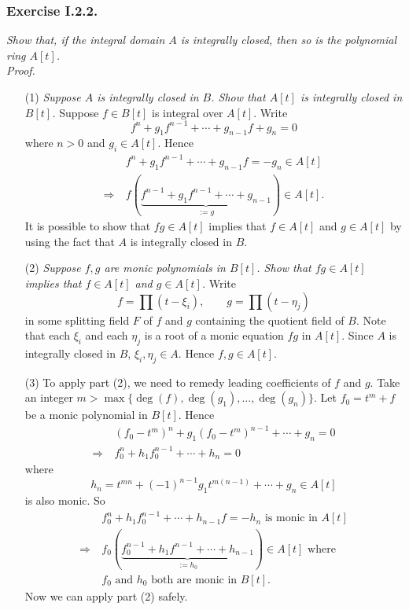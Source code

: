 \documentclass{article}
\begin{document}



\subsubsection*{Exercise I.2.2.}
\emph{Show that, if the integral domain $A$ is integrally closed,
then so is the polynomial ring $A[t]$.} \\



\emph{Proof.}
\begin{enumerate}
\item[(1)]
  \emph{Suppose $A$ is integrally closed in $B$.
  Show that $A[t]$ is integrally closed in $B[t]$.}
  Suppose $f \in B[t]$ is integral over $A[t]$.
  Write
  \[
    f^n + g_1 f^{n-1} + \cdots + g_{n-1} f + g_n = 0 
  \]
  where $n > 0$ and $g_i \in A[t]$.
  Hence
  \begin{align*}
    &\:
    f^n + g_1 f^{n-1} + \cdots + g_{n-1} f = -g_n \in A[t] \\
    \Longrightarrow &\:
    f(\underbrace{f^{n-1} + g_1 f^{n-1} + \cdots + g_{n-1}}_{:= g}) \in A[t].
  \end{align*}
  It is possible to show that $fg \in A[t]$ implies that $f \in A[t]$ and $g \in A[t]$
  by using the fact that $A$ is integrally closed in $B$.

\item[(2)]
  \emph{Suppose $f, g$ are monic polynomials in $B[t]$.
  Show that $fg \in A[t]$ implies that $f \in A[t]$ and $g \in A[t]$.}
  Write
  \[
    f = \prod (t - \xi_i),
    \qquad
    g = \prod (t - \eta_j)
  \]
  in some splitting field $F$ of $f$ and $g$ containing the quotient field of $B$.
  Note that each $\xi_i$ and each $\eta_j$ is a root of a monic equation $fg$ in $A[t]$.
  Since $A$ is integrally closed in $B$, $\xi_i, \eta_j \in A$.
  Hence $f, g \in A[t]$.

\item[(3)]
  To apply part (2), we need to remedy leading coefficients of $f$ and $g$.
  Take an integer $m > \max\{\deg(f), \deg(g_1), \ldots, \deg(g_n) \}$.
  Let $f_0 = t^m + f$ be a monic polynomial in $B[t]$.
  Hence
  \begin{align*}
    &\:
    (f_0 - t^m)^n + g_1 (f_0 - t^m)^{n-1} + \cdots + g_n = 0 \\
    \Longrightarrow &\:
    f_0^n + h_1 f_0^{n-1} + \cdots + h_n = 0
  \end{align*}
  where
  \[
    h_n = t^{mn} + (-1)^{n-1} g_1 t^{m(n-1)} + \cdots + g_n \in A[t]
  \]
  is also monic.
  So
  \begin{align*}
    &\:
    f_0^n + h_1 f_0^{n-1} + \cdots + h_{n-1} f = -h_n \text{ is monic in } A[t] \\
    \Longrightarrow &\:
    f_0(\underbrace{f_0^{n-1} + h_1 f^{n-1} + \cdots + h_{n-1}}_{:= h_0}) \in A[t] \text{ where } \\
    &\: \text{$f_0$ and $h_0$ both are monic in } B[t].
  \end{align*}
  Now we can apply part (2) safely.


\end{enumerate}
\end{document}
